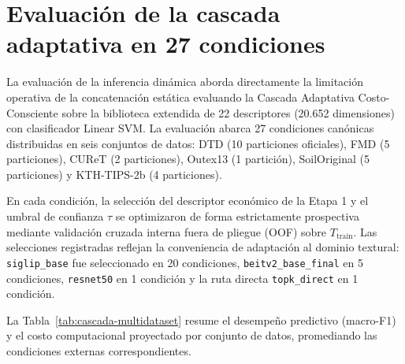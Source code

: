 \section[Cascada adaptativa en 27 condiciones]{Evaluación de la cascada adaptativa en 27 condiciones}\label{sec:resultados-cascada}

La evaluación de la inferencia dinámica aborda directamente la limitación operativa de la concatenación estática evaluando la Cascada Adaptativa Costo-Consciente sobre la biblioteca extendida de 22 descriptores (20.652 dimensiones) con clasificador Linear SVM. La evaluación abarca 27 condiciones canónicas distribuidas en seis conjuntos de datos: DTD (10 particiones oficiales), FMD (5 particiones), CUReT (2 particiones), Outex13 (1 partición), SoilOriginal (5 particiones) y KTH-TIPS-2b (4 particiones).

En cada condición, la selección del descriptor económico de la Etapa 1 y el umbral de confianza $\tau$ se optimizaron de forma estrictamente prospectiva mediante validación cruzada interna fuera de pliegue (OOF) sobre $T_{\text{train}}$. Las selecciones registradas reflejan la conveniencia de adaptación al dominio textural: \texttt{siglip\_base} fue seleccionado en 20 condiciones, \texttt{beitv2\_base\_final} en 5 condiciones, \texttt{resnet50} en 1 condición y la ruta directa \texttt{topk\_direct} en 1 condición.

La Tabla~\ref{tab:cascada-multidataset} resume el desempeño predictivo (macro-F1) y el costo computacional proyectado por conjunto de datos, promediando las condiciones externas correspondientes.

